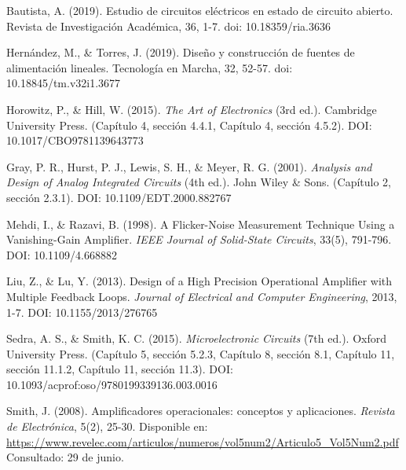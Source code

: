 \documentclass[a4paper,12pt,spanish]{article}
\begin{document}
\begin{thebibliography}{9}

       
      Bautista, A. (2019). Estudio de circuitos eléctricos en estado de circuito abierto. Revista de Investigación Académica, 36, 1-7. doi: 10.18359/ria.3636
    
      Hernández, M., \& Torres, J. (2019). Diseño y construcción de fuentes de alimentación lineales. Tecnología en Marcha, 32, 52-57. doi: 10.18845/tm.v32i1.3677
    
      Horowitz, P., \& Hill, W. (2015). \textit{The Art of Electronics} (3rd ed.). Cambridge University Press. (Capítulo 4, sección 4.4.1, Capítulo 4, sección 4.5.2). DOI: 10.1017/CBO9781139643773
        
      Gray, P. R., Hurst, P. J., Lewis, S. H., \& Meyer, R. G. (2001). \textit{Analysis and Design of Analog Integrated Circuits} (4th ed.). John Wiley \& Sons. (Capítulo 2, sección 2.3.1). DOI: 10.1109/EDT.2000.882767
    
      Mehdi, I., \& Razavi, B. (1998). A Flicker-Noise Measurement Technique Using a Vanishing-Gain Amplifier. \textit{IEEE Journal of Solid-State Circuits}, 33(5), 791-796. DOI: 10.1109/4.668882
    
      Liu, Z., \& Lu, Y. (2013). Design of a High Precision Operational Amplifier with Multiple Feedback Loops. \textit{Journal of Electrical and Computer Engineering}, 2013, 1-7. DOI: 10.1155/2013/276765
        
      Sedra, A. S., \& Smith, K. C. (2015). \textit{Microelectronic Circuits} (7th ed.). Oxford University Press. (Capítulo 5, sección 5.2.3, Capítulo 8, sección 8.1, Capítulo 11, sección 11.1.2, Capítulo 11, sección 11.3). DOI: 10.1093/acprof:oso/9780199339136.003.0016
    
      Smith, J. (2008). Amplificadores operacionales: conceptos y aplicaciones. \textit{Revista de Electrónica}, 5(2), 25-30. Disponible en: \url{https://www.revelec.com/articulos/numeros/vol5num2/Articulo5_Vol5Num2.pdf} Consultado: 29 de junio.

\end{thebibliography}



\label{LastPage}
\end{document}
